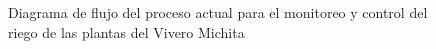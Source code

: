 \begin{figure}[ht]
    \caption{Diagrama de flujo del proceso actual para el monitoreo y control del riego de las plantas del Vivero Michita}
    \label{fig:proceso_actual}
\end{figure}